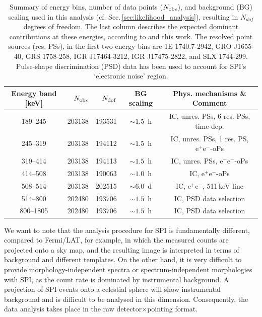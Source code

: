 \documentclass[doublespace,nopageskip]{VTthesis} %
\newcommand{\mrm}[1]{\mathrm{#1}}
\begin{document}
\begin{appendices}
	\begin{table}
		\centering
		\caption{Summary of energy bins, number of data points ($N_{\rm obs}$), and background (BG) scaling used in this analysis (cf. Sec.\,\ref{sec:likelihood_analysis}), resulting in $N_{dof}$ degrees of freedom. The last column describes the expected dominant contributions at these energies, according to \citet{Strong2005_gammaconti} and this work. The resolved point sources (res. PSs), in the first two energy bins are 1E 1740.7-2942, GRO J1655-40, GRS 1758-258, IGR J17464-3212, IGR J17475-2822, and SLX 1744-299. Pulse-shape discrimination (PSD) data has been used to account for SPI's `electronic noise' region.}
		\begin{tabular}{crrcc}
			\hline
			\hline
			Energy band [keV] & $N_{\rm obs}$ & $N_{\rm dof}$ & BG scaling & Phys. mechanisms \& Comment \\
			\hline
			189--245  & 203138 & 193531 & $\sim 1.5$~h & IC, unres. PSs, 6 res. PSs, time-dep. \\
			245--319  & 203138 & 194112 & $\sim 1.5$~h & IC, unres. PSs, 1 res. PS, $\mrm{e^+e^-}$-oPs \\
			319--414  & 203138 & 194113 & $\sim 1.5$~h & IC, unres. PSs, $\mrm{e^+e^-}$-oPs \\
			414--508  & 203138 & 190063 & $\sim 1.0$~h & IC, $\mrm{e^+e^-}$-oPs \\
			508--514  & 203138 & 202515 & $\sim 6.0$~d & IC, $\mrm{e^+e^-}$, 511\,keV line\\
			514--800  & 202480 & 193706 & $\sim 1.5$~h & IC, PSD data selection \\
			800--1805 & 202480 & 193706 & $\sim 1.5$~h & IC, PSD data selection \\
			\hline
			\hline
		\end{tabular}
		\label{tab:data_set_energies}
	\end{table}
	
	
	
	We want to note that the analysis procedure for SPI is fundamentally different, compared to Fermi/LAT, for example, in which the measured counts are projected onto a sky map, and the resulting image is interpreted in terms of background and different templates.
	On the other hand, it is very difficult to provide morphology-independent spectra or spectrum-independent morphologies with SPI, as the count rate is dominated by instrumental background.
	A projection of SPI events onto a celestial sphere will show instrumental background and is difficult to be analysed in this dimension.
	Consequently, the data analysis takes place in the raw detector$\times$pointing format.
	

\end{appendices}
\end{document}
